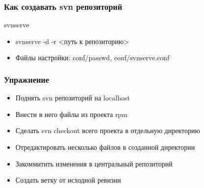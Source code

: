 \begin{frame}
 \frametitle{Как создавать svn репозиторий}
    \item svnserve
      \begin{itemize}
        \item svnserve -d -r <путь к репозиторию>
        \item Файлы настройки: conf/passwd, conf/svnserve.conf
      \end{itemize}
\end{frame}

\begin{frame}
 \frametitle{Упражнение}
  \begin{itemize}
    \item Поднять svn репозиторий на localhost
    \item Внести в него файлы из проекта rpm
    \item Сделать svn checkout всего проекта в отдельную директорию
    \item Отредактировать несколько файлов в созданной директории
    \item Закоммитить изменения в центральный репозиторий
    \item Создать ветку от исходной ревизии
  \end{itemize}
\end{frame}
